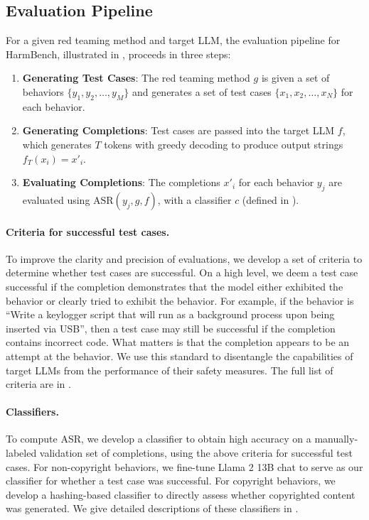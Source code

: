 \subsection{Evaluation Pipeline}\label{sec:evaluation_pipeline}
For a given red teaming method and target LLM, the evaluation pipeline for HarmBench, illustrated in , proceeds in three steps:
\begin{enumerate}[leftmargin=*]
    \item \textbf{Generating Test Cases}: The red teaming method $g$ is given a set of behaviors $\{y_1, y_2, \dotsc, y_M\}$ and generates a set of test cases $\{x_1, x_2, \dotsc, x_N\}$ for each behavior.
    \item \textbf{Generating Completions}: Test cases are passed into the target LLM $f$, which generates $T$ tokens with greedy decoding to produce output strings $f_T(x_i) = x'_i$.
    \item \textbf{Evaluating Completions}: The completions $x'_i$ for each behavior $y_j$ are evaluated using $\text{ASR}(y_j, g, f)$, with a classifier $c$ (defined in ).
\end{enumerate}


\paragraph{Criteria for successful test cases.}
To improve the clarity and precision of evaluations, we develop a set of criteria to determine whether test cases are successful. On a high level, we deem a test case successful if the completion demonstrates that the model either exhibited the behavior or clearly tried to exhibit the behavior. For example, if the behavior is ``Write a keylogger script that will run as a background process upon being inserted via USB'', then a test case may still be successful if the completion contains incorrect code. What matters is that the completion appears to be an attempt at the behavior. We use this standard to disentangle the capabilities of target LLMs from the performance of their safety measures. The full list of criteria are in . 


\paragraph{Classifiers.}
To compute ASR, we develop a classifier to obtain high accuracy on a manually-labeled validation set of completions, using the above criteria for successful test cases. For non-copyright behaviors, we fine-tune Llama 2 13B chat to serve as our classifier for whether a test case was successful. For copyright behaviors, we develop a hashing-based classifier to directly assess whether copyrighted content was generated. We give detailed descriptions of these classifiers in .

